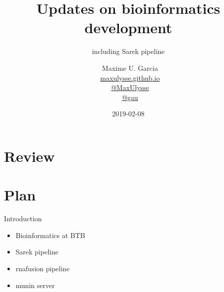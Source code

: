 \documentclass[usepdftitle=false]{beamer}
\title{%
	\vspace{-3.2cm}%
	Updates on bioinformatics development
}
\subtitle{%
	including Sarek pipeline
}
\author{
	\vspace{-.6cm}
	\faUser\ Maxime U. Garcia\\
	\faGlobe\ \href{https://maxulysse.github.io/}{maxulysse.github.io}\\
	\faGithub\ \href{https://github.com/MaxUlysse/}{@MaxUlysse}\\
	\faTwitter\ \href{https://twitter.com/gau/}{@gau}\\
}
\date{
	2019-02-08
}
\begin{document}
\section{Review}

{
	\maketitle
}

\section{Plan}
\begin{frame}{Introduction}
	\begin{itemize}
		\item Bioinformatics at BTB
		\pause
		\item Sarek pipeline
		\pause
		\item rnafusion pipeline
		\pause
		\item munin server
	\end{itemize}
\end{frame}
\end{document}
